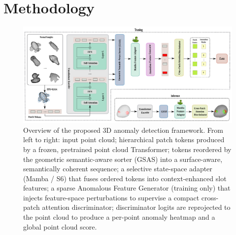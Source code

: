 \section{Methodology}

\begin{figure}[h!]
  \centering 
    \includegraphics[width=0.98\linewidth]{figs/overview}
  \caption{Overview of the proposed 3D anomaly detection framework. From left to right: input point cloud; hierarchical patch tokens produced by a frozen, pretrained point cloud Transformer; tokens reordered by the geometric semantic-aware sorter (GSAS) into a surface-aware, semantically coherent sequence; a selective state-space adapter (Mamba / S6) that fuses ordered tokens into context-enhanced slot features; a sparse Anomalous Feature Generator (training only) that injects feature-space perturbations to supervise a compact cross-patch attention discriminator; discriminator logits are reprojected to the point cloud to produce a per-point anomaly heatmap and a global point cloud score.}
  \label{fig:overview}
\end{figure}

